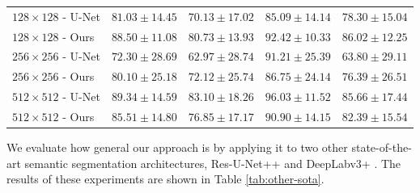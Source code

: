 \begin{table}[H]
\begin{tabularx}{\textwidth}{lCCCC}
\midrule
$128 \times 128$ - U-Net & $81.03 \pm 14.45$ & $70.13 \pm 17.02$ & $85.09 \pm 14.14$ & $78.30 \pm 15.04$ \\
$128 \times 128$ - Ours & $88.50 \pm 11.08$ & $80.73 \pm 13.93$ & $92.42 \pm 10.33$ & $86.02 \pm 12.25$ \\
\midrule
$256 \times 256$ - U-Net & $72.30 \pm 28.69$ & $62.97 \pm 28.74$ & $91.21 \pm 25.39$ & $63.80 \pm 29.11$ \\
$256 \times 256$ - Ours & $80.10 \pm 25.18$ & $72.12 \pm 25.74$ & $86.75 \pm 24.14$ & $76.39 \pm 26.51$ \\
\midrule
$512 \times 512$ - U-Net & $89.34 \pm 14.59$ & $83.10 \pm 18.26$ & $96.03 \pm 11.52$ & $85.66 \pm 17.44$ \\
$512 \times 512$ - Ours & $85.51 \pm 14.80$ & $76.85 \pm 17.17$ & $90.90 \pm 14.15$ & $82.39 \pm 15.54$ \\
		\end{tabularx}
\end{table}

We evaluate how general our approach is by applying it to two other state-of-the-art semantic segmentation architectures, Res-U-Net++ \cite{jhaResUNetAdvancedArchitecture2019, zhouUNetNestedUNet2018b} and DeepLabv3+ \cite{chenEncoderDecoderAtrousSeparable2018b}. The results of these experiments are shown in Table \ref{tab:other-sota}.


